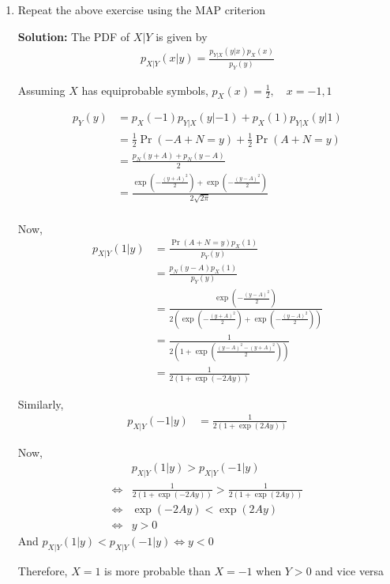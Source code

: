 \documentclass[journal,12pt,twocolumn]{IEEEtran}
\newcommand{\solution}{\noindent \textbf{Solution: }}
\providecommand{\pr}[1]{\ensuremath{\Pr\left(#1\right)}}
\providecommand{\brak}[1]{\ensuremath{\left(#1\right)}}
\numberwithin{equation}{section}
\renewcommand\thesection{\arabic{section}}
\begin{document}
\begin{enumerate}[label=\thesection.\arabic*,ref=\thesection.\theenumi]
	\item Repeat the above exercise using the MAP criterion	
	
	\solution The PDF of $X|Y$ is given by
	\begin{align}
		p_{X|Y}(x|y) = 	\frac{p_{Y|X}(y|x) p_X(x)}{p_Y(y)}
	\end{align}
		 
	Assuming $X$ has equiprobable symbols, $p_X(x) = \frac12, \quad x = -1, 1$
	
	\begin{align}
		p_Y(y) &= p_X(-1) p_{Y|X}(y|-1) + p_X(1) p_{Y|X}(y|1) \\
		&= \frac12 \pr{-A+N=y} + \frac12 \pr{A+N=y} \\
		&= \frac{p_N(y+A) + p_N(y-A)}{2} \\
		&= \frac{\exp\brak{-\frac{(y+A)^2}{2}} + \exp\brak{-\frac{(y-A)^2}{2}}}{2\sqrt{2\pi}} \\
	\end{align}
	
	Now,
	\begin{align}		
		p_{X|Y}(1|y) &= \frac{\pr{A+N=y} p_X(1)}{p_Y(y)} \\
		&= \frac{p_N(y-A) p_X(1)}{p_Y(y)} \\
		&= \frac{\exp\brak{-\frac{(y-A)^2}{2}}}{2\brak{\exp\brak{-\frac{(y+A)^2}{2}} + \exp\brak{-\frac{(y-A)^2}{2}}}} \\
		&= \frac{1}{2\brak{1 + \exp\brak{\frac{(y-A)^2-(y+A)^2}{2}}}} \\
		&= \frac{1}{2\brak{1 + \exp(-2Ay)}}
	\end{align}
	
	Similarly,
	\begin{align}
		p_{X|Y}(-1|y) &= \frac{1}{2\brak{1 + \exp(2Ay)}}
	\end{align}
	
	Now,
	\begin{align}
		&p_{X|Y}(1|y) > p_{X|Y}(-1|y) \\
		\iff &\frac{1}{2\brak{1 + \exp(-2Ay)}} > \frac{1}{2\brak{1 + \exp(2Ay)}} \\
		\iff &\exp(-2Ay) < \exp(2Ay) \\
		\iff &y > 0
	\end{align}
	And $p_{X|Y}(1|y) < p_{X|Y}(-1|y) \iff y < 0$
	
	Therefore, $X=1$ is more probable than $X=-1$ when $Y>0$ and vice versa
	

\end{enumerate}
\end{document}
